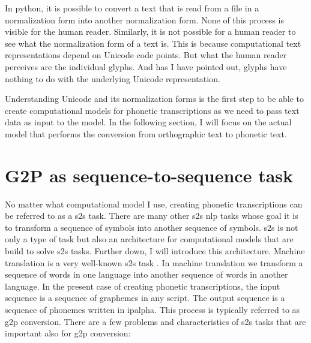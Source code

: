In python, it is possible to convert a text that is read from a file in a normalization form into another normalization form. None of this process is visible for the human reader. Similarly, it is not possible for a human reader to see what the normalization form of a text is. This is because computational text representations depend on Unicode code points. But what the human reader perceives are the individual glyphs. And has I have pointed out, glyphs have nothing to do with the underlying Unicode representation.  

Understanding Unicode and its normalization forms is the first step to be able to create computational models for phonetic transcriptions as we need to pass text data as input to the model. In the following section, I will focus on the actual model that performs the conversion from orthographic text to phonetic text.

\section{G2P as sequence-to-sequence task}
\label{model_theory}
No matter what computational model I use, creating phonetic transcriptions can be referred to as a \acf{s2s} task. There are many other \ac{s2s} \ac{nlp} tasks whose goal it is to transform a sequence of symbols into another sequence of symbols. \ac{s2s} is not only a type of task but also an architecture for computational models that are build to solve \ac{s2s} tasks. Further down, I will introduce this architecture. Machine translation is a very well-known \ac{s2s} task \citep{Rao2015GraphemetophonemeCU}. In machine translation we transform a sequence of words in one language into another sequence of words in another language. In the present case of creating phonetic transcriptions, the input sequence is a sequence of graphemes in any script. The output sequence is a sequence of phonemes written in \ac{ipalpha}. This process is typically referred to as \acf{g2p} conversion. There are a few problems and characteristics of \ac{s2s} tasks that are important also for \ac{g2p} conversion:

